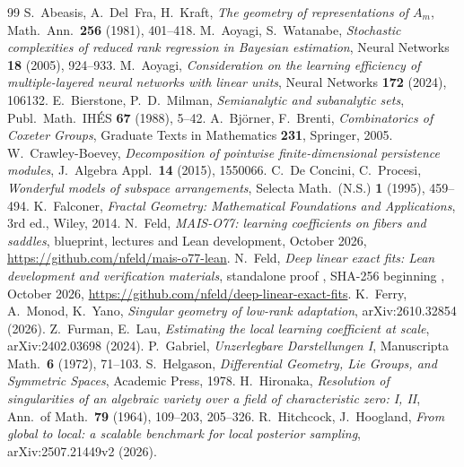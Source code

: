 \documentclass[11pt,a4paper]{article}
\theoremstyle{definition}
\theoremstyle{remark}
\numberwithin{equation}{section}
\begin{document}
\begin{thebibliography}{99}
 S.~Abeasis, A.~Del~Fra, H.~Kraft, \emph{The geometry of representations of $A_m$}, Math.\ Ann.\ \textbf{256} (1981), 401--418.
 M.~Aoyagi, S.~Watanabe, \emph{Stochastic complexities of reduced rank regression in Bayesian estimation}, Neural Networks \textbf{18} (2005), 924--933.
 M.~Aoyagi, \emph{Consideration on the learning efficiency of multiple-layered neural networks with linear units}, Neural Networks \textbf{172} (2024), 106132.
 E.~Bierstone, P.~D.~Milman, \emph{Semianalytic and subanalytic sets}, Publ.\ Math.\ IHÉS \textbf{67} (1988), 5--42.
 A.~Björner, F.~Brenti, \emph{Combinatorics of Coxeter Groups}, Graduate Texts in Mathematics \textbf{231}, Springer, 2005.
 W.~Crawley-Boevey, \emph{Decomposition of pointwise finite-dimensional persistence modules}, J.\ Algebra Appl.\ \textbf{14} (2015), 1550066.
 C.~De Concini, C.~Procesi, \emph{Wonderful models of subspace arrangements}, Selecta Math.\ (N.S.) \textbf{1} (1995), 459--494.
 K.~Falconer, \emph{Fractal Geometry: Mathematical Foundations and Applications}, 3rd ed., Wiley, 2014.
 N.~Feld, \emph{MAIS-O77: learning coefficients on fibers and saddles}, blueprint, lectures and Lean development, October 2026, \url{https://github.com/nfeld/mais-o77-lean}.
 N.~Feld, \emph{Deep linear exact fits: Lean development and verification materials}, standalone proof , SHA-256 beginning , October 2026, \url{https://github.com/nfeld/deep-linear-exact-fits}.
 K.~Ferry, A.~Monod, K.~Yano, \emph{Singular geometry of low-rank adaptation}, arXiv:2610.32854 (2026).
 Z.~Furman, E.~Lau, \emph{Estimating the local learning coefficient at scale}, arXiv:2402.03698 (2024).
 P.~Gabriel, \emph{Unzerlegbare Darstellungen I}, Manuscripta Math.\ \textbf{6} (1972), 71--103.
 S.~Helgason, \emph{Differential Geometry, Lie Groups, and Symmetric Spaces}, Academic Press, 1978.
 H.~Hironaka, \emph{Resolution of singularities of an algebraic variety over a field of characteristic zero: I, II}, Ann.\ of Math.\ \textbf{79} (1964), 109--203, 205--326.
 R.~Hitchcock, J.~Hoogland, \emph{From global to local: a scalable benchmark for local posterior sampling}, arXiv:2507.21449v2 (2026).

\end{thebibliography}
\end{document}
